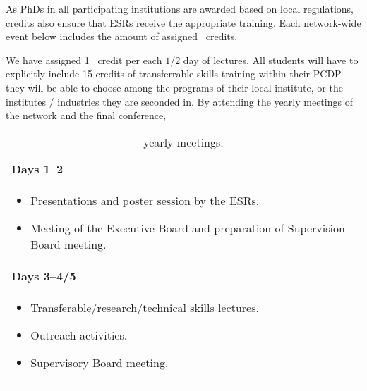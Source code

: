 As PhDs in all participating institutions are awarded based
on local regulations, 
\acronym credits also ensure that ESRs receive the appropriate training. %
Each network-wide event below includes the
amount of assigned \acronym\ credits.

We have assigned 1 \acronym\ credit
per each $1/2$ day of lectures. 
All students will have to explicitly include 15 credits of 
transferrable skills training 
within their PCDP - they will be able to choose among the programs
of their local institute, or the institutes / industries they are
seconded in. By attending the yearly meetings of the network and the final conference,
\begin{wraptable}{l}{0.45\textwidth}
	\caption{\acronym yearly meetings.\label{tab:YearlyMeeting}}
    \vspace{4mm}
	\small
	\begin{tabular}{m{75mm}}
		\midrule 
		\textbf{Days 1--2}\tabularnewline 
		{\begin{itemize}%
				\item Presentations and poster session by the ESRs.
				\item Meeting of the Executive Board and \linebreak
				preparation of Supervision Board meeting.
                \vspace{-5mm}
			\end{itemize}}
            \tabularnewline
            \midrule 
			\textbf{Days 3--4/5}\tabularnewline 
			\begin{itemize}%
				\item Transferable/research/technical skills lectures.
				\item Outreach activities. 
				\item Supervisory Board meeting. \vspace{-4mm}
			\end{itemize} \tabularnewline \midrule
		\end{tabular}
		\vspace{-3mm}
	\end{wraptable}
